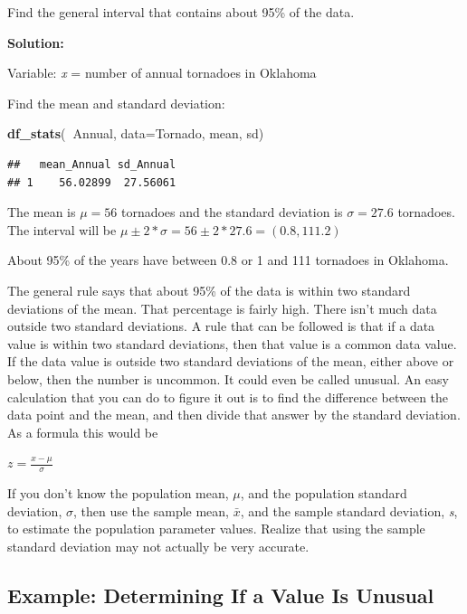 \documentclass[
]{book}
\newenvironment{Shaded}{\begin{snugshade}}{\end{snugshade}}
\newcommand{\DataTypeTok}[1]{\textcolor[rgb]{0.13,0.29,0.53}{#1}}
\newcommand{\KeywordTok}[1]{\textcolor[rgb]{0.13,0.29,0.53}{\textbf{#1}}}
\newcommand{\NormalTok}[1]{#1}
\newcommand{\OperatorTok}[1]{\textcolor[rgb]{0.81,0.36,0.00}{\textbf{#1}}}
\begin{document}
Find the general interval that contains about 95\% of the data.

\textbf{Solution:}

Variable: \emph{x} = number of annual tornadoes in Oklahoma

Find the mean and standard deviation:

\begin{Shaded}
\begin{Highlighting}[]
\KeywordTok{df_stats}\NormalTok{(}\OperatorTok{~}\NormalTok{Annual, }\DataTypeTok{data=}\NormalTok{Tornado, mean, sd)}
\end{Highlighting}
\end{Shaded}

\begin{verbatim}
##   mean_Annual sd_Annual
## 1    56.02899  27.56061
\end{verbatim}

The mean is \(\mu=56\) tornadoes and the standard deviation is \(\sigma=27.6\) tornadoes. The interval will be \(\mu\pm2*\sigma=56\pm2*27.6=(0.8,111.2)\)

About 95\% of the years have between 0.8 or 1 and 111 tornadoes in Oklahoma.

The general rule says that about 95\% of the data is within two standard deviations of the mean. That percentage is fairly high. There isn't much data outside two standard deviations. A rule that can be
followed is that if a data value is within two standard deviations, then that value is a common data value. If the data value is outside two standard deviations of the mean, either above or below, then the number is uncommon. It could even be called unusual. An easy calculation that you can do to figure it out is to find the difference between the data point and the mean, and then divide that answer by the standard
deviation. As a formula this would be

\(z=\frac{x-\mu}{\sigma}\)

If you don't know the population mean, \(\mu\), and the population standard deviation, \(\sigma\), then use the sample mean, \(\bar{x}\), and the sample standard deviation, \emph{s}, to estimate the population parameter values. Realize that using the sample standard deviation may not actually be very accurate.

\hypertarget{example-determining-if-a-value-is-unusual}{%
\subsection{Example: Determining If a Value Is Unusual}\label{example-determining-if-a-value-is-unusual}}
\end{document}
